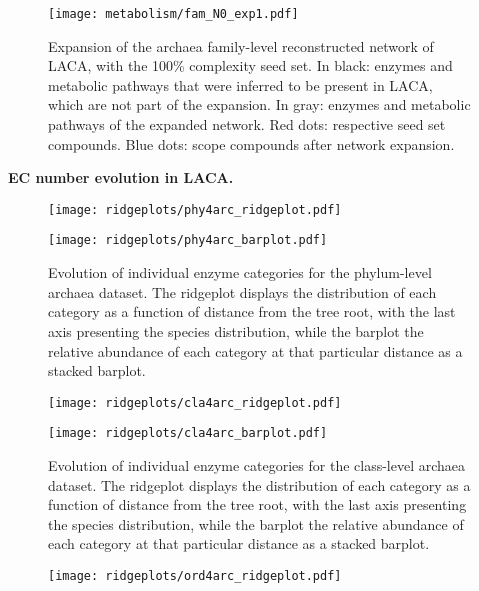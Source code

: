 \begin{figure}[H]
    \centering
    \texttt{[image: metabolism/fam\_N0\_exp1.pdf]}
    \caption{Expansion of the archaea family-level reconstructed network of LACA, with the 100\% complexity seed set. In black: enzymes and metabolic pathways that were inferred to be present in LACA, which are not part of the expansion. In gray: enzymes and metabolic pathways of the expanded network. Red dots: respective seed set compounds. Blue dots: scope compounds after network expansion.}    
    \label{fam4arc_metnetexp_1}
\end{figure}

\newpage
\textbf{EC number evolution in LACA.}
\begin{figure}[H]
    \centering
    \texttt{[image: ridgeplots/phy4arc\_ridgeplot.pdf]}
    \label{ridgeplot_phy4arc}
\end{figure}

\begin{figure}[H]
    \centering
    \texttt{[image: ridgeplots/phy4arc\_barplot.pdf]}
    \caption[]{Evolution of individual enzyme categories for the phylum-level archaea dataset. The ridgeplot displays the distribution of each category as a function of distance from the tree root, with the last axis presenting the species distribution, while the barplot the relative abundance of each category at that particular distance as a stacked barplot.}
    \label{barplot_phy4arc}
\end{figure}

\begin{figure}[H]
    \centering
    \texttt{[image: ridgeplots/cla4arc\_ridgeplot.pdf]}
    \label{ridgeplot_cla4arc}
\end{figure}

\begin{figure}[H]
    \centering
    \texttt{[image: ridgeplots/cla4arc\_barplot.pdf]}
    \caption[]{Evolution of individual enzyme categories for the class-level archaea dataset. The ridgeplot displays the distribution of each category as a function of distance from the tree root, with the last axis presenting the species distribution, while the barplot the relative abundance of each category at that particular distance as a stacked barplot.}
    \label{barplot_cla4arc}
\end{figure}

\begin{figure}[H]
    \centering
    \texttt{[image: ridgeplots/ord4arc\_ridgeplot.pdf]}
    \label{ridgeplot_ord4arc}
\end{figure}

